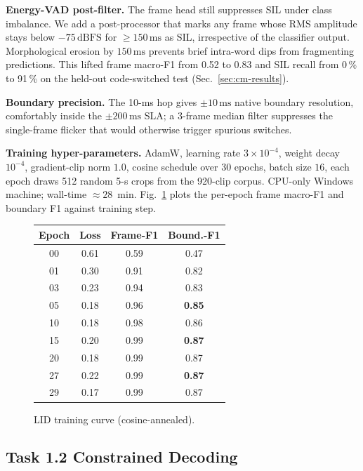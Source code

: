 \documentclass[conference]{IEEEtran}
\begin{document}
\textbf{Energy-VAD post-filter.}
The frame head still suppresses SIL under class imbalance. We add
a post-processor that marks any frame whose RMS amplitude stays
below $-75\,\mathrm{dBFS}$ for $\geq\!150\,\mathrm{ms}$ as SIL,
irrespective of the classifier output. Morphological erosion by
$150\,\mathrm{ms}$ prevents brief intra-word dips from fragmenting
predictions. This lifted frame macro-F1 from 0.52 to 0.83 and SIL
recall from 0\,\% to 91\,\% on the held-out code-switched test
(Sec.~\ref{sec:cm-results}).

\textbf{Boundary precision.} The 10-ms hop gives $\pm 10\,\mathrm{ms}$
native boundary resolution, comfortably inside the
$\pm 200\,\mathrm{ms}$ SLA; a 3-frame median filter suppresses the
single-frame flicker that would otherwise trigger spurious switches.

\textbf{Training hyper-parameters.}
AdamW, learning rate $3\!\times\!10^{-4}$, weight decay $10^{-4}$,
gradient-clip norm $1.0$, cosine schedule over $30$ epochs, batch
size $16$, each epoch draws 512 random 5-s crops from the 920-clip
corpus. CPU-only Windows machine; wall-time $\approx 28$~min.
Fig.~\ref{fig:train} plots the per-epoch frame macro-F1 and boundary
F1 against training step.

\begin{figure}[h]
\centering
\begin{tabular}{cccc}
\toprule
Epoch & Loss & Frame-F1 & Bound.-F1 \\
\midrule
00 & 0.61 & 0.59 & 0.47 \\
01 & 0.30 & 0.91 & 0.82 \\
03 & 0.23 & 0.94 & 0.83 \\
05 & 0.18 & 0.96 & \textbf{0.85} \\
10 & 0.18 & 0.98 & 0.86 \\
15 & 0.20 & 0.99 & \textbf{0.87} \\
20 & 0.18 & 0.99 & 0.87 \\
27 & 0.22 & 0.99 & \textbf{0.87} \\
29 & 0.17 & 0.99 & 0.87 \\
\bottomrule
\end{tabular}
\caption{LID training curve (cosine-annealed).}
\label{fig:train}
\end{figure}

\subsection{Task 1.2 Constrained Decoding}
\label{sec:lm}
\end{document}
